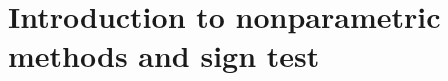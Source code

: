 \documentclass[openany]{book}
\begin{document}

\tableofcontents
\newpage

\chapter{Introduction to nonparametric methods and sign test}






\end{document}
